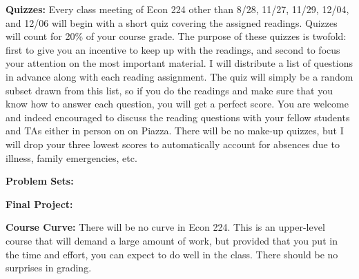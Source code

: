\documentclass[11pt, letterpaper]{article}
\begin{document}
\noindent \textbf{Quizzes:} 
Every class meeting of Econ 224 other than 8/28, 11/27, 11/29, 12/04, and 12/06 will begin with a short quiz covering the assigned readings.
Quizzes will count for 20\% of your course grade.
The purpose of these quizzes is twofold: first to give you an incentive to keep up with the readings, and second to focus your attention on the most important material.
I will distribute a list of questions in advance along with each reading assignment.
The quiz will simply be a random subset drawn from this list, so if you do the readings and make sure that you know how to answer each question, you will get a perfect score.
You are welcome and indeed encouraged to discuss the reading questions with your fellow students and TAs either in person on on Piazza.
There will be no make-up quizzes, but I will drop your three lowest scores to automatically account for absences due to illness, family emergencies, etc.


\medskip


\noindent \textbf{Problem Sets:} 

\medskip

\noindent \textbf{Final Project:} 

\medskip


\noindent \textbf{Course Curve:}
There will be no curve in Econ 224. 
This is an upper-level course that will demand a large amount of work, but provided that you put in the time and effort, you can expect to do well in the class. 
There should be no surprises in grading.

\medskip



\end{document}
